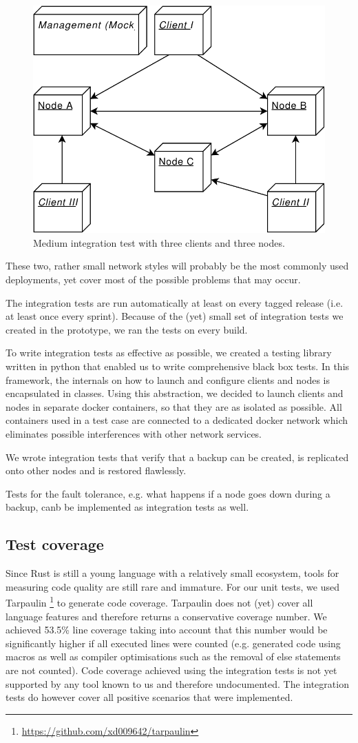 \begin{figure}
	\centering
	\includegraphics[width=0.5\linewidth]{resources/integration_test_medium}
	\caption[Medium integration test]{Medium integration test with three clients and three nodes.}
	\label{fig:integrationtestmedium}
\end{figure}

These two, rather small network styles will probably be the most commonly used deployments, yet cover most of the possible problems that may occur.

The integration tests are run automatically at least on every tagged release (i.e. at least once every sprint). Because of the (yet) small set of integration tests we created in the prototype, we ran the tests on every build.

To write integration tests as effective as possible, we created a testing library written in python that enabled us to write comprehensive black box tests. In this framework, the internals on how to launch and configure clients and nodes is encapsulated in classes. Using this abstraction, we decided to launch clients and nodes in separate docker containers, so that they are as isolated as possible. All containers used in a test case are connected to a dedicated docker network which eliminates possible interferences with other network services.

We wrote integration tests that verify that a backup can be created, is replicated onto other nodes and is restored flawlessly.

Tests for the fault tolerance, e.g. what happens if a node goes down during a backup, canb be implemented as integration tests as well.

\subsection{Test coverage}

Since Rust is still a young language with a relatively small ecosystem, tools for measuring code quality are still rare and immature. For our unit tests, we used Tarpaulin \footnote{\url{https://github.com/xd009642/tarpaulin}} to generate code coverage. Tarpaulin does not (yet) cover all language features and therefore returns a conservative coverage number. We achieved 53.5\% line coverage taking into account that this number would be significantly higher if all executed lines were counted (e.g. generated code using macros as well as compiler optimisations such as the removal of else statements are not counted).
Code coverage achieved using the integration tests is not yet supported by any tool known to us and therefore undocumented. The integration tests do however cover all positive scenarios that were implemented.

